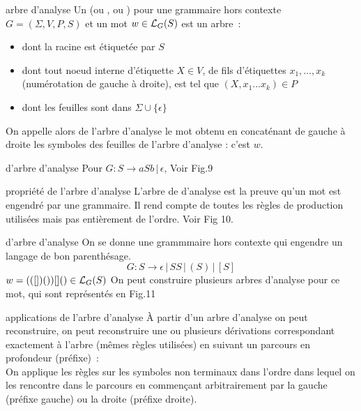 \begin{adjustwidth}{-3cm}{-3cm}
\begin{definition}{}{arbre d'analyse}
    Un  (ou , ou ) pour une grammaire hors contexte $G = (\Sigma, V,P,S)$ et un mot $w \in \mathcal{L}_{G}(S)$ est un arbre~:
    \begin{itemize}
        \item dont la racine est étiquetée par $S$
        \item dont tout noeud interne d'étiquette $X \in V$, de fils d'étiquettes $x_1, \dots, x_k$ (numérotation de gauche à droite), est tel que $(X,x_1\dots x_k) \in P$
        \item dont les feuilles sont dans $\Sigma \cup \{\epsilon\}$
    \end{itemize}
    On appelle alors  de l'arbre d'analyse le mot obtenu en concaténant de gauche à droite les symboles des feuilles de l'arbre d'analyse : c'est $w$.
\end{definition}

\begin{exemple}{}{d'arbre d'analyse}
    Pour $G : S \rightarrow aSb \,\vert\, \epsilon$, Voir Fig.9
\end{exemple}


\begin{remarque}{}{propriété de l'arbre d'analyse}
    L'arbre de d'analyse est la preuve qu'un mot est engendré par une grammaire. Il rend compte de toutes les règles de production utilisées mais pas entièrement de l'ordre. Voir Fig 10.
\end{remarque}

\begin{exemple}{}{d'arbre d'analyse}
    On se donne une grammmaire hors contexte qui engendre un langage de bon parenthésage.
    $$G : S \rightarrow \epsilon \,\vert\, SS \,\vert\, (S) \,\vert\, [S]$$
    $w = (([])())[]() \in \mathcal{L}_{G}(S)$
    On peut construire plusieurs arbres d'analyse pour ce mot, qui sont représentés en Fig.11
\end{exemple}

\begin{remarque}{}{applications de l'arbre d'analyse}
    À partir d'un arbre d'analyse on peut reconstruire, on peut reconstruire une ou plusieurs dérivations correspondant exactement à l'arbre (mêmes règles utilisées) en suivant un parcours en profondeur (préfixe)~:\\
    On applique les règles sur les symboles non terminaux dans l'ordre dans lequel on les rencontre dans le parcours en commençant arbitrairement par la gauche (préfixe gauche) ou la droite (préfixe droite).
\end{remarque}


\end{adjustwidth}
